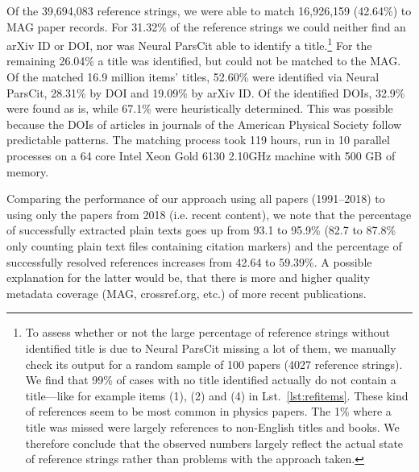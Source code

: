 Of the 39,694,083 reference strings, we were able to match 16,926,159 (42.64\%) to MAG paper records. For 31.32\% of the reference strings we could neither find an arXiv ID or DOI, nor was Neural ParsCit able to identify a title.\footnote{To assess whether or not the large percentage of reference strings without identified title is due to Neural ParsCit missing a lot of them, we manually check its output for a random sample of 100 papers (4027 reference strings). We find that 99\% of cases with no title identified actually do not contain a title---like for example items (1), (2) and (4) in Lst.~\ref{lst:refitems}. These kind of references seem to be most common in physics papers. The 1\% where a title was missed were largely references to non-English titles and books. We therefore conclude that the observed numbers largely reflect the actual state of reference strings rather than problems with the approach taken.} For the remaining 26.04\% a title was identified, but could not be matched to the MAG.
Of the matched 16.9 million items' titles, 52.60\% were identified via Neural ParsCit, 28.31\% by DOI and 19.09\% by arXiv ID. Of the identified DOIs, 32.9\% were found as is, while 67.1\% were heuristically determined. This was possible because the DOIs of articles in journals of the American Physical Society follow predictable patterns. The matching process took 119 hours, run in 10 parallel processes on a 64 core Intel Xeon Gold 6130 2.10GHz machine with 500 GB of memory.

Comparing the performance of our approach using all papers (1991--2018) to using only the papers from 2018 (i.e. recent content), we note that the percentage of successfully extracted plain texts goes up from 93.1 to 95.9\% (82.7 to 87.8\% only counting plain text files containing citation markers) and the percentage of successfully resolved references increases from 42.64 to 59.39\%. A possible explanation for the latter would be, that there is more and higher quality metadata coverage (MAG, crossref.org, etc.) of more recent publications.

